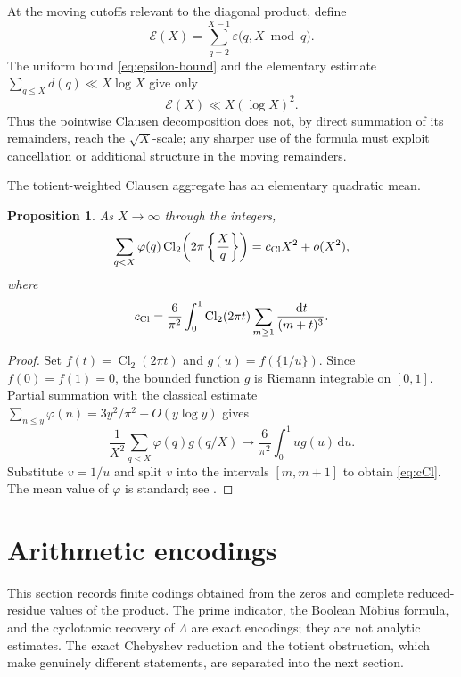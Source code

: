 \documentclass[11pt]{amsart}
\numberwithin{equation}{section}
\newtheorem{proposition}[theorem]{Proposition}
\theoremstyle{definition}
\theoremstyle{remark}
\newcommand{\eps}{\varepsilon}
\newcommand{\dd}{\,\mathrm d}
\begin{document}
At the moving cutoffs relevant to the diagonal product, define
\begin{equation}\label{eq:mathcalE}
 \mathcal E(X)=\sum_{q=2}^{X-1}\eps\bigl(q,X\bmod q\bigr).
\end{equation}
The uniform bound \eqref{eq:epsilon-bound} and the elementary estimate
\(\sum_{q\leq X}d(q)\ll X\log X\) give only
\begin{equation}\label{eq:mathcalE-bound}
 \mathcal E(X)\ll X(\log X)^2.
\end{equation}
Thus the pointwise Clausen decomposition does not, by direct summation of
its remainders, reach the \(\sqrt X\)-scale; any sharper use of the formula
must exploit cancellation or additional structure in the moving
remainders.

The totient-weighted Clausen aggregate has an elementary quadratic mean.

\begin{proposition}\label{prop:Clausen-main}
As \(X\to\infty\) through the integers,
\begin{equation}\label{eq:Clausen-main}
 \sum_{q<X}\varphi(q)
 \operatorname{Cl}_2\!\left(2\pi\left\{\frac Xq\right\}\right)
 =c_{\rm Cl}X^2+o(X^2),
\end{equation}
where
\begin{equation}\label{eq:cCl}
 c_{\rm Cl}=\frac6{\pi^2}\int_0^1
 \operatorname{Cl}_2(2\pi t)
 \sum_{m\geq1}\frac{\dd t}{(m+t)^3}.
\end{equation}
\end{proposition}

\begin{proof}
Set \(f(t)=\operatorname{Cl}_2(2\pi t)\) and
\(g(u)=f(\{1/u\})\).  Since \(f(0)=f(1)=0\), the bounded function \(g\)
is Riemann integrable on \([0,1]\).  Partial summation with the classical
estimate
\(\sum_{n\leq y}\varphi(n)=3y^2/\pi^2+O(y\log y)\) gives
\[
 \frac1{X^2}\sum_{q<X}\varphi(q)g(q/X)
 \longrightarrow\frac6{\pi^2}\int_0^1ug(u)\dd u.
\]
Substitute \(v=1/u\) and split \(v\) into the intervals
\([m,m+1]\) to obtain \eqref{eq:cCl}.  The mean value of \(\varphi\) is
standard; see \cite[Chapter~3]{Apostol1976}.
\end{proof}

\section{Arithmetic encodings}
\label{sec:recoveries}

This section records finite codings obtained from the zeros and complete
reduced-residue values of the product.  The prime indicator, the Boolean
M\"obius formula, and the cyclotomic recovery of \(\Lambda\) are exact
encodings; they are not analytic estimates.  The exact Chebyshev reduction
and the totient obstruction, which make genuinely different statements, are
separated into the next section.
\end{document}

